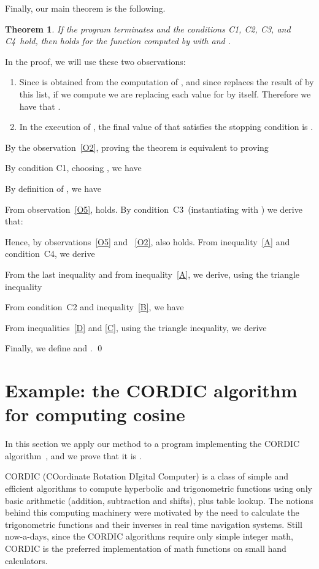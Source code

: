 \documentclass[copyright,creativecommons]{eptcs}
\newtheorem{theorem}{Theorem}[section]
\newcommand{\Cone}{C1}
\newcommand{\Ctwo}{C2}
\newcommand{\Cthree}{C3}
\newcommand{\Cfour}{C4}
\renewenvironment{proof}{\noindent {\bf Proof}\quad}{\qed}
\begin{document}
Finally, our main theorem is the following.
\begin{theorem}
If the program  terminates and the conditions \Cone, \Ctwo,
\Cthree, and \Cfour\ hold, then  holds for
the function computed by  with  and
.
\end{theorem}


\begin{proof}
In the proof, we will use these two observations:
\begin{enumerate}
\item \label{O2} Since  is obtained from the computation of
  , and since  replaces the result of  by this
  list, if we compute  we are replacing each value for 
  by itself. Therefore we have that . 



\item \label{O5} In the execution of , the final value of 
  that satisfies the stopping condition  is . 
\end{enumerate}

By the observation~\ref{O2}, proving the theorem is equivalent to
proving 

By condition \Cone, choosing , we have 

By definition of , we have

From observation~\ref{O5},  holds.
By condition~\Cthree \, (instantiating  with ) we derive that:

Hence, by observations~\ref{O5} and ~\ref{O2},  also
holds. From inequality~\eqref{A} and condition~\Cfour, we derive

From the last inequality and from  inequality~\eqref{A}, we derive, using
the triangle inequality

From condition~{\Ctwo}  and inequality~\eqref{B}, we have

From inequalities~\eqref{D} and \eqref{C}, using the triangle inequality, we derive

Finally, we define  and .
\end{proof}

\section{Example:  the CORDIC algorithm for computing cosine}\label{sec:cordi}
In this section  we apply our method to a program implementing  the CORDIC algorithm~\cite{volder59}, and we prove that  it is
.

CORDIC (COordinate Rotation DIgital Computer) is a class of simple and
efficient algorithms to compute  hyperbolic and trigonometric
functions using only basic arithmetic (addition, subtraction and
shifts), plus table lookup. The notions behind this computing
machinery were motivated by the need to calculate the trigonometric
functions and their inverses in real time navigation systems. Still
now-a-days, since the CORDIC algorithms  require  only  simple integer
math, CORDIC is the preferred implementation of math functions on
small  hand calculators.
\end{document}
